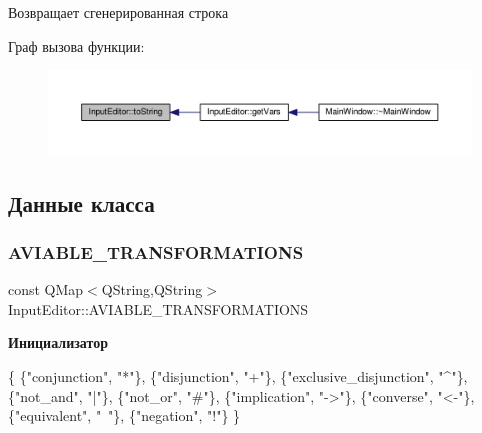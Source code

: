 \begin{DoxyReturn}{Возвращает}
сгенерированная строка 
\end{DoxyReturn}
Граф вызова функции\+:\nopagebreak
\begin{figure}[H]
\begin{center}
\leavevmode
\includegraphics[width=350pt]{class_input_editor_ab65dc1f4a87be3abf8bfff14c1a54532_icgraph}
\end{center}
\end{figure}


\subsection{Данные класса}
\mbox{\label{class_input_editor_a328642e3ae078e059dc95bb4f945451c}} 
\subsubsection{\texorpdfstring{A\+V\+I\+A\+B\+L\+E\+\_\+\+T\+R\+A\+N\+S\+F\+O\+R\+M\+A\+T\+I\+O\+NS}{AVIABLE\_TRANSFORMATIONS}}
{\footnotesize\ttfamily const Q\+Map$<$Q\+String,Q\+String$>$ Input\+Editor\+::\+A\+V\+I\+A\+B\+L\+E\+\_\+\+T\+R\+A\+N\+S\+F\+O\+R\+M\+A\+T\+I\+O\+NS}

{\bfseries Инициализатор}
\begin{DoxyCode}
\{
        \{\textcolor{stringliteral}{"conjunction"}, \textcolor{stringliteral}{"*"}\},
        \{\textcolor{stringliteral}{"disjunction"}, \textcolor{stringliteral}{"+"}\},
        \{\textcolor{stringliteral}{"exclusive\_disjunction"}, \textcolor{stringliteral}{"^"}\},
        \{\textcolor{stringliteral}{"not\_and"}, \textcolor{stringliteral}{"|"}\},
        \{\textcolor{stringliteral}{"not\_or"}, \textcolor{stringliteral}{"#"}\},
        \{\textcolor{stringliteral}{"implication"}, \textcolor{stringliteral}{"->"}\},
        \{\textcolor{stringliteral}{"converse"}, \textcolor{stringliteral}{"<-"}\},
        \{\textcolor{stringliteral}{"equivalent"}, \textcolor{stringliteral}{"~"}\},
        \{\textcolor{stringliteral}{"negation"}, \textcolor{stringliteral}{"!"}\}
    \}
\end{DoxyCode}


